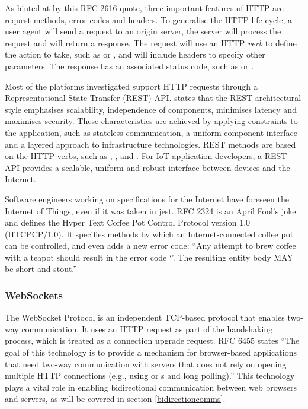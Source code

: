         As hinted at by this RFC 2616 quote, three important features of HTTP are request methods, error codes and headers. To generalise the HTTP life cycle, a user agent will send a request to an origin server, the server will process the request and will return a response. The request will use an HTTP \emph{verb} to define the action to take, such as  or , and will include headers to specify other parameters. The response has an associated status code, such as  or .

        Most of the platforms investigated support HTTP requests through a Representational State Transfer (REST) API. \citet{rest:2000} states that the REST architectural style emphasises scalability, independence of components, minimises latency and maximises security. These characteristics are achieved by applying constraints to the application, such as stateless communication, a uniform component interface and a layered approach to infrastructure technologies. REST methods are based on the HTTP verbs, such as , ,  and . For IoT application developers, a REST API provides a scalable, uniform and robust interface between devices and the Internet. %

        Software engineers working on specifications for the Internet have foreseen the Internet of Things, even if it was taken in jest. RFC 2324 \citep{rfc2324} is an April Fool's joke and defines the Hyper Text Coffee Pot Control Protocol version 1.0 (HTCPCP/1.0). It specifies methods by which an Internet-connected coffee pot can be controlled, and even adds a new error code: ``Any attempt to brew coffee with a teapot should result in the error code `'. The resulting entity body MAY be short and stout.''

      \subsubsection{WebSockets}
        The WebSocket Protocol is an independent TCP-based protocol that enables two-way communication. It uses an HTTP request as part of the handshaking process, which is treated as a connection upgrade request. RFC 6455 \citep{rfc6455} states ``The goal of this technology is to provide a mechanism for browser-based applications that need two-way communication with servers that does not rely on opening multiple HTTP connections (e.g., using  or s and long polling).'' This technology plays a vital role in enabling bidirectional communication between web browsers and servers, as will be covered in section \ref{bidirectioncomms}.

